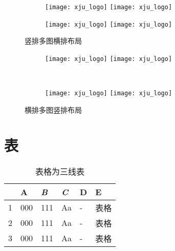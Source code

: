\begin{figure}[!htb]
	\centering
	\begin{subfigure}[t]{0.13\linewidth}
		\captionsetup{justification=centering}
		\begin{minipage}[b]{1\linewidth}
			\texttt{[image: xju\_logo]} \vspace{-1ex} \vfill
			\texttt{[image: xju\_logo]}
			\caption{}
		\end{minipage}
	\end{subfigure}
	\begin{subfigure}[t]{0.13\linewidth}
		\captionsetup{justification=centering}
		\begin{minipage}[b]{1\linewidth}
			\texttt{[image: xju\_logo]} \vspace{-1ex} \vfill
			\texttt{[image: xju\_logo]}
			\caption{}
		\end{minipage}
	\end{subfigure}
	\caption{竖排多图横排布局}
	\label{xju_logo3}
\end{figure}

\begin{figure}[!htb]
	\centering
	\begin{subfigure}[t]{0.3\linewidth}
		\captionsetup{justification=centering}
		\begin{minipage}[b]{1\linewidth}
			\texttt{[image: xju\_logo]}
			\texttt{[image: xju\_logo]}
			\caption{}
		\end{minipage}
	\end{subfigure}\\
	\begin{subfigure}[t]{0.3\linewidth}
		\captionsetup{justification=centering}
		\begin{minipage}[b]{1\linewidth}
			\texttt{[image: xju\_logo]}
			\texttt{[image: xju\_logo]}
			\caption{}
		\end{minipage}
	\end{subfigure}
	\caption{横排多图竖排布局}
	\label{xju_logo4}
\end{figure}
	
\section{表}
	
\begin{table}[htb]
	\centering
	\caption{表格为三线表}
	\label{table1}
	\begin{tabular}{llllll}
		\toprule[1.5pt]
		& A & \emph{B} & \textit{C} & D & E \\
		\midrule[1pt]
		1 & 000 & 111 & Aa & - & 表格	\\
		2 & 000 & 111 & Aa & - & 表格	\\
		3 & 000 & 111 & Aa & - & 表格	\\
		\bottomrule[1.5pt]
	\end{tabular}
\end{table}

